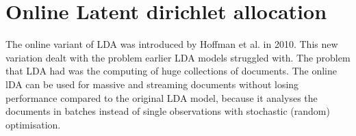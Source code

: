 \section{Online Latent dirichlet allocation}
The online variant of LDA was introduced  by Hoffman et al. in 2010.\cite{Hoffman2010OnlineAllocation} This new variation dealt with the problem earlier LDA models struggled with. The problem that LDA had was the computing of huge collections of documents. The online lDA can be used for massive and streaming documents without losing performance compared to the original LDA model, because it analyses the documents in batches instead of single observations with stochastic (random) optimisation.\cite{Beaver2012StochasticInference} 

